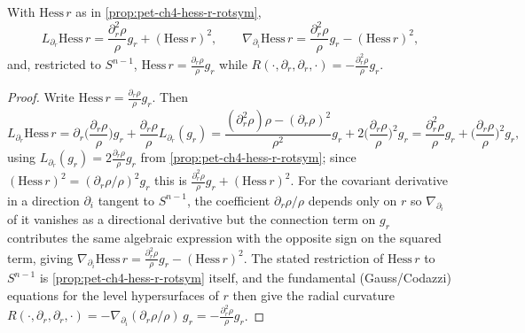 \begin{lemma}
  \label{lem:pet-ch4-hess-r-derivatives}
  With $\mathrm{Hess}\,r$ as in \cref{prop:pet-ch4-hess-r-rotsym},
  \[
    L_{\partial_r}\mathrm{Hess}\,r=\frac{\partial_r^2\rho}{\rho}g_r+(\mathrm{Hess}\,r)^2,
    \qquad
    \nabla_{\partial_i}\mathrm{Hess}\,r=\frac{\partial_r^2\rho}{\rho}g_r-(\mathrm{Hess}\,r)^2,
  \]
  and, restricted to $S^{n-1}$, $\mathrm{Hess}\,r=\tfrac{\partial_r\rho}{\rho}g_r$
  while $R(\cdot,\partial_r,\partial_r,\cdot)=-\tfrac{\partial_r^2\rho}{\rho}g_r$.
\end{lemma}
\begin{proof}
  Write $\mathrm{Hess}\,r=\tfrac{\partial_r\rho}{\rho}g_r$. Then
  \[
    L_{\partial_r}\mathrm{Hess}\,r
    =\partial_r\!\Big(\frac{\partial_r\rho}{\rho}\Big)g_r+\frac{\partial_r\rho}{\rho}L_{\partial_r}(g_r)
    =\frac{(\partial_r^2\rho)\rho-(\partial_r\rho)^2}{\rho^2}g_r+2\Big(\frac{\partial_r\rho}{\rho}\Big)^2g_r
    =\frac{\partial_r^2\rho}{\rho}g_r+\Big(\frac{\partial_r\rho}{\rho}\Big)^2g_r,
  \]
  using $L_{\partial_r}(g_r)=2\tfrac{\partial_r\rho}{\rho}g_r$ from
  \cref{prop:pet-ch4-hess-r-rotsym}; since $(\mathrm{Hess}\,r)^2=(\partial_r\rho/\rho)^2g_r$
  this is $\tfrac{\partial_r^2\rho}{\rho}g_r+(\mathrm{Hess}\,r)^2$. For the covariant
  derivative in a direction $\partial_i$ tangent to $S^{n-1}$, the coefficient
  $\partial_r\rho/\rho$ depends only on $r$ so $\nabla_{\partial_i}$ of it vanishes as
  a directional derivative but the connection term on $g_r$ contributes the same
  algebraic expression with the opposite sign on the squared term, giving
  $\nabla_{\partial_i}\mathrm{Hess}\,r=\tfrac{\partial_r^2\rho}{\rho}g_r-(\mathrm{Hess}\,r)^2$.
  The stated restriction of $\mathrm{Hess}\,r$ to $S^{n-1}$ is
  \cref{prop:pet-ch4-hess-r-rotsym} itself, and the fundamental (Gauss/Codazzi)
  equations for the level hypersurfaces of $r$ then give the radial curvature
  $R(\cdot,\partial_r,\partial_r,\cdot)=-\nabla_{\partial_i}(\partial_r\rho/\rho)\,g_r=-\tfrac{\partial_r^2\rho}{\rho}g_r$.
\end{proof}

